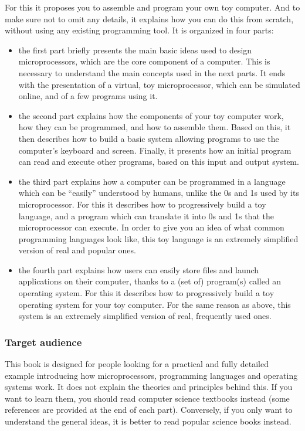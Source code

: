 For this it proposes you to assemble and program your own toy computer. And to
make sure not to omit any details, it explains how you can do this from scratch,
without using any existing programming tool. It is organized in four parts:
\begin{itemize}
  \item the first part briefly presents the main basic ideas used to design
  microprocessors, which are the core component of a computer. This is
  necessary to understand the main concepts used in the next parts. It ends
  with the presentation of a virtual, toy microprocessor, which can be
  simulated online, and of a few programs using it.

  \item the second part explains how the components of your toy computer work,
  how they can be programmed, and how to assemble them. Based on this, it then
  describes how to build a basic system allowing programs to use the computer's
  keyboard and screen. Finally, it presents how an initial program can read and
  execute other programs, based on this input and output system.

  \item the third part explains how a computer can be programmed in a language
  which can be ``easily'' understood by humans, unlike the 0s and 1s used by
  its microprocessor. For this it describes how to progressively build a toy
  language, and a program which can translate it into 0s and 1s that the
  microprocessor can execute. In order to give you an idea of what common
  programming languages look like, this toy language is an extremely simplified
  version of real and popular ones.

  \item the fourth part explains how users can easily store files and launch
  applications on their computer, thanks to a (set of) program(s) called an
  operating system. For this it describes how to progressively build a toy
  operating system for your toy computer. For the same reason as above, this
  system is an extremely simplified version of real, frequently used ones.
\end{itemize}

\subsubsection{Target audience}

This book is designed for people looking for a practical and fully detailed
example introducing how microprocessors, programming languages and operating
systems work. It does not explain the theories and principles behind this. If
you want to learn them, you should read computer science textbooks instead
(some references are provided at the end of each part). Conversely, if you only
want to understand the general ideas, it is better to read popular science
books instead.

